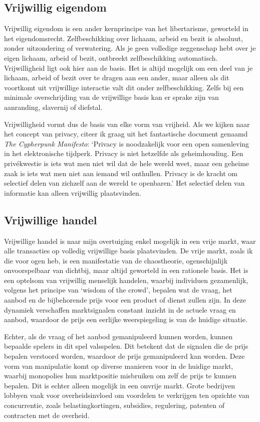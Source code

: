 \subsection{Vrijwillig eigendom}

Vrijwillig eigendom is een ander kernprincipe van het libertarisme, geworteld in het eigendomsrecht. Zelfbeschikking over lichaam, arbeid en bezit is absoluut, zonder uitzondering of verwatering. Als je geen volledige zeggenschap hebt over je eigen lichaam, arbeid of bezit, ontbreekt zelfbeschikking automatisch. Vrijwilligheid ligt ook hier aan de basis. Het is altijd mogelijk om een deel van je lichaam, arbeid of bezit over te dragen aan een ander, maar alleen als dit voortkomt uit vrijwillige interactie valt dit onder zelfbeschikking. Zelfs bij een minimale overschrijding van de vrijwillige basis kan er sprake zijn van aanranding, slavernij of diefstal.

Vrijwilligheid vormt dus de basis van elke vorm van vrijheid. Als we kijken naar het concept van privacy, citeer ik graag uit het fantastische document genaamd \emph{The Cypherpunk Manifesto}: `Privacy is noodzakelijk voor een open samenleving in het elektronische tijdperk. Privacy is niet hetzelfde als geheimhouding. Een privékwestie is iets wat men niet wil dat de hele wereld weet, maar een geheime zaak is iets wat men niet aan iemand wil onthullen. Privacy is de kracht om selectief delen van zichzelf aan de wereld te openbaren.' Het selectief delen van informatie kan alleen vrijwillig plaatsvinden.

\subsection{Vrijwillige handel}

Vrijwillige handel is naar mijn overtuiging enkel mogelijk in een vrije markt, waar alle transacties op volledig vrijwillige basis plaatsvinden. De vrije markt, zoals ik die voor ogen heb, is een manifestatie van de chaostheorie, ogenschijnlijk onvoorspelbaar van dichtbij, maar altijd geworteld in een rationele basis. Het is een optelsom van vrijwillig menselijk handelen, waarbij individuen gezamenlijk, volgens het principe van `wisdom of the crowd', bepalen wat de vraag, het aanbod en de bijbehorende prijs voor een product of dienst zullen zijn. In deze dynamiek verschaffen marktsignalen constant inzicht in de actuele vraag en aanbod, waardoor de prijs een eerlijke weerspiegeling is van de huidige situatie.

Echter, als de vraag of het aanbod gemanipuleerd kunnen worden, kunnen bepaalde spelers in dit spel valsspelen. Dit betekent dat de signalen die de prijs bepalen verstoord worden, waardoor de prijs gemanipuleerd kan worden. Deze vorm van manipulatie komt op diverse manieren voor in de huidige markt, waarbij monopolies hun marktpositie misbruiken om zelf de prijs te kunnen bepalen. Dit is echter alleen mogelijk in een onvrije markt. Grote bedrijven lobbyen vaak voor overheidsinvloed om voordelen te verkrijgen ten opzichte van concurrentie, zoals belastingkortingen, subsidies, regulering, patenten of contracten met de overheid.


